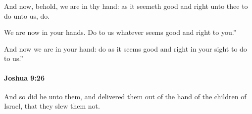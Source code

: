 			\begin{versebox}
					\item[BHS] 
					\item[ASV] And now, behold, we are in thy hand: as it seemeth good and right unto thee to do unto us, do.
					\item[NIV] We are now in your hands. Do to us whatever seems good and right to you.”
					\item[NRSV] And now we are in your hand: do as it seems good and right in your sight to do to us.”
			\end{versebox}

		\paragraph{Joshua 9:26} %
			\label{JOSHUA-9-26}

			And so did he unto them, and delivered them out of the hand of the children of Israel, that they slew them not.

